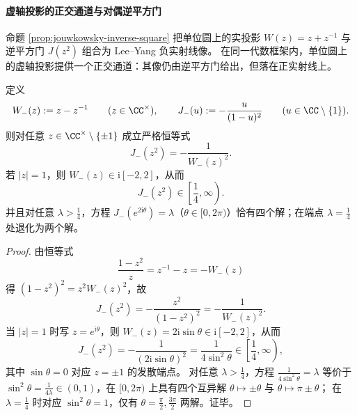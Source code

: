 \paragraph{虚轴投影的正交通道与对偶逆平方门}
命题 \ref{prop:jouwkowsky-inverse-square} 把单位圆上的实投影 \(W(z)=z+z^{-1}\) 与逆平方门 \(J(z^2)\) 组合为 Lee--Yang 负实射线像。
在同一代数框架内，单位圆上的虚轴投影提供一个正交通道：其像仍由逆平方门给出，但落在正实射线上。

\begin{proposition}[虚轴投影门与正实射线像]\label{prop:leyang-orthogonal-dual-imaginary-projection}
定义
\[
W_{-}(z):=z-z^{-1}\qquad(z\in\CC^{\times}),
\qquad
J_{-}(u):=-\frac{u}{(1-u)^2}\qquad(u\in\CC\setminus\{1\}).
\]
则对任意 \(z\in\CC^{\times}\setminus\{\pm 1\}\) 成立严格恒等式
\[
J_{-}(z^{2})=-\frac{1}{W_{-}(z)^2}.
\]
若 \(|z|=1\)，则 \(W_{-}(z)\in \mathrm{i}[-2,2]\)，从而
\[
J_{-}(z^{2})\in\left[\frac14,\infty\right).
\]
并且对任意 \(\lambda>\frac14\)，方程 \(J_{-}(e^{2\mathrm{i}\theta})=\lambda\)（\(\theta\in[0,2\pi)\)）恰有四个解；在端点 \(\lambda=\frac14\) 处退化为两个解。
\end{proposition}
\begin{proof}
由恒等式
\[
\frac{1-z^{2}}{z}=z^{-1}-z=-W_{-}(z)
\]
得 \((1-z^{2})^{2}=z^{2}W_{-}(z)^{2}\)，故
\[
J_{-}(z^{2})
=-\frac{z^{2}}{(1-z^{2})^{2}}
=-\frac{1}{W_{-}(z)^{2}}.
\]
当 \(|z|=1\) 时写 \(z=e^{\mathrm{i}\theta}\)，则 \(W_{-}(z)=2\mathrm{i}\sin\theta\in \mathrm{i}[-2,2]\)，从而
\[
J_{-}(z^{2})=-\frac{1}{(2\mathrm{i}\sin\theta)^{2}}=\frac{1}{4\sin^{2}\theta}\in\left[\frac14,\infty\right),
\]
其中 \(\sin\theta=0\) 对应 \(z=\pm 1\) 的发散端点。
对任意 \(\lambda>\frac14\)，方程 \(\frac{1}{4\sin^{2}\theta}=\lambda\) 等价于 \(\sin^{2}\theta=\frac{1}{4\lambda}\in(0,1)\)，在 \([0,2\pi)\) 上具有四个互异解 \(\theta\mapsto\pm\theta\) 与 \(\theta\mapsto\pi\pm\theta\)；
在 \(\lambda=\frac14\) 时对应 \(\sin^{2}\theta=1\)，仅有 \(\theta=\frac{\pi}{2},\frac{3\pi}{2}\) 两解。证毕。
\end{proof}

\endinput
